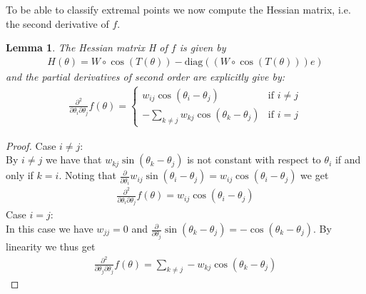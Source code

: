 \documentclass[12pt,a4paper]{article}
\theoremstyle{mythm}
\newtheorem{lem}[thm]{Lemma}
\begin{document}
To be able to classify extremal points we now compute the Hessian matrix, i.e. the second derivative of $ f $.
\begin{lem}
The Hessian matrix H of $ f $ is given by 
\begin{align}
\label{def:Hessian} 
H(\theta) = W \circ \cos( T(\theta) ) - \text{diag} \left(  \left( W \circ \cos( T (\theta) ) \right) e  \right) 
\end{align} 
and the partial derivatives of second order are explicitly give by:
\begin{align*}
\frac{ \partial ^{ 2 }  }{ \partial \theta_i \partial \theta_j } f(\theta) = \begin{cases}
w _{ij} \cos( \theta_i - \theta_j )  & \text{if } i \neq j \\
- \sum_{ k \neq j  }^{ }w _{ kj } \cos( \theta_k - \theta_j )   & \text{if } i =j 
\end{cases}
\end{align*} 
\end{lem} 
\begin{proof}
Case $ i \neq j$: \\
By $ i \neq j  $ we have that $ w _{ kj } \sin( \theta_k - \theta_j  )  $ is not constant with respect to $ \theta_i $ if and only if $ k = i $. Noting that $ \frac{ \partial
}{ \partial \theta_i } w _{ ij } \sin( \theta_i - \theta_j ) = w _{ ij } \cos( \theta_i - \theta_j )   $ we get
\begin{align*}
\frac{ \partial ^{ 2 }  }{ \partial \theta_i \partial \theta_j } f (\theta) = w _{ ij } \cos( \theta_i - \theta_j ) 
\end{align*} 
Case $ i = j $: \\
In this case we have $ w _{ jj } = 0 $ and $ \frac{ \partial  }{ \partial \theta_j } \sin( \theta_k - \theta_j  ) = - \cos( \theta_k - \theta_j ) $. By linearity we thus get
\begin{align*}
\frac{ \partial ^{ 2 }  }{ \partial \theta_j \partial \theta_j } f(\theta) = \sum_{ k \neq j   }^{  } -w _{ kj } \cos( \theta_k - \theta_j ) 
\end{align*} 
\end{proof}
\end{document}
